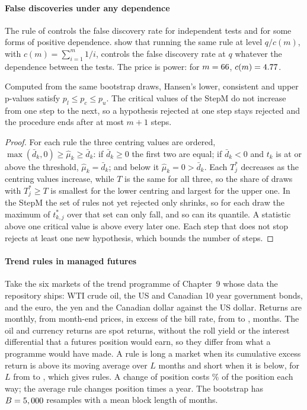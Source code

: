 \begin{chapterrefs}
\paragraph{False discoveries under any dependence}
The rule of \textcite{benjamini1995} controls the false discovery rate for independent tests and for some
forms of positive dependence. \textcite{benjamini2001} show that running the same rule at level $q/c(m)$,
with $c(m)=\sum_{i=1}^m1/i$, controls the false discovery rate at $q$ whatever the dependence between the
tests. The price is power: for $m=66$, $c(m)=4.77$.

\begin{proposition}\label{prop12:snoop}
Computed from the same bootstrap draws, Hansen's lower, consistent and upper p-values satisfy
$p_l\le p_c\le p_u$. The critical values of the StepM do not increase from one step to the next, so a
hypothesis rejected at one step stays rejected and the procedure ends after at most $m+1$ steps.
\end{proposition}

\begin{proof}
For each rule the three centring values are ordered, $\max(\bar d_k,0)\ge\hat\mu_k\ge\bar d_k$: if
$\bar d_k\ge0$ the first two are equal; if $\bar d_k<0$ and $t_k$ is at or above the threshold,
$\hat\mu_k=\bar d_k$; and below it $\hat\mu_k=0>\bar d_k$. Each $T^{*}_j$ decreases as the centring
values increase, while $T$ is the same for all three, so the share of draws with $T^{*}_j\ge T$ is
smallest for the lower centring and largest for the upper one. In the StepM the set of rules not yet
rejected only shrinks, so for each draw the maximum of $t^{*}_{k,j}$ over that set can only fall, and so
can its quantile. A statistic above one critical value is above every later one. Each step that does not
stop rejects at least one new hypothesis, which bounds the number of steps.
\end{proof}

\paragraph{Trend rules in managed futures}
Take the six markets of the trend programme of Chapter~9 whose data the repository ships: WTI crude oil,
the US and Canadian 10 year government bonds, and the euro, the yen and the Canadian dollar against the
US dollar. Returns are monthly, from month-end prices, in excess of the bill rate, from \mtFirst{} to
\mtLast, \mtN{} months. The oil and currency returns are spot returns, without the roll yield or the
interest differential that a futures position would earn, so they differ from what a programme would
have made. A rule is long a market when its cumulative excess return is above its moving average over
$L$ months and short when it is below, for $L$ from \mtLookMin{} to \mtLookMax, which gives \mtRules{}
rules. A change of position costs \mtCost\% of the position each way; the average rule changes position
\mtTurn{} times a year. The bootstrap has $B=5,000$ resamples with a mean block length of \mtBlock{} months.


\end{chapterrefs}
